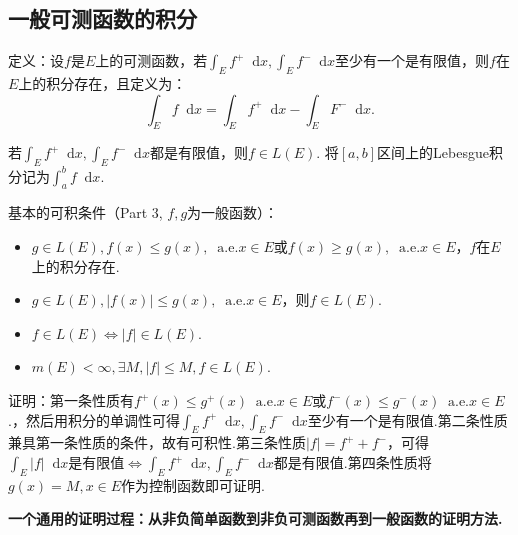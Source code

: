 \documentclass[bwprint, withoutpreface]{cumcmthesis}
\newcommand*{\dif}{\mathop{}\!\mathrm{d}}
\begin{document}
\subsection{一般可测函数的积分}
\indent 定义：设$f$是$E$上的可测函数，若$\int_E f^+ \dif x, \int_E f^- \dif x$至少有一个是有限值，则$f$在$E$上的积分存在，且定义为：
\begin{equation*}
	\int_E f \dif x = \int_E f^+ \dif x - \int_E F^- \dif x.
\end{equation*}

若$\int_E f^+ \dif x, \int_E f^- \dif x$都是有限值，则$f \in L(E)$. 将$[a, b]$区间上的Lebesgue积分记为$\int_{a}^{b}{f \dif x}$.

基本的可积条件（Part 3, $f, g$为一般函数）：
\begin{itemize}[itemindent=2em]
	\item $g \in L(E), f(x) \leqslant g(x), \mathop{} \! \mathrm{a.e.} x \in E \mbox{或} f(x) \geqslant g(x), \mathop{} \! \mathrm{a.e.} x \in E$，$f$在$E$上的积分存在.
	\item $g \in L(E), |f(x)| \leqslant g(x), \mathop{} \! \mathrm{a.e.} x \in E$，则$f \in L(E)$.
	\item $f \in L(E) \Leftrightarrow |f| \in L(E)$.
	\item $m(E) < \infty, \exists M, |f| \leqslant M, f \in L(E)$.
\end{itemize}

证明：第一条性质有$f^+(x) \leqslant g^+(x) \mathop{} \! \mathrm{a.e.} x \in E \mbox{或} f^-(x) \leqslant g^-(x) \mathop{} \! \mathrm{a.e.} x \in E$.，然后用积分的单调性可得$\int_E f^+ \dif x, \int_E f^- \dif x$至少有一个是有限值.第二条性质兼具第一条性质的条件，故有可积性.第三条性质$|f| = f^+ + f^-$，可得$\int_E |f| \dif x \mbox{是有限值} \Leftrightarrow \int_E f^+ \dif x, \int_E f^- \dif x \mbox{都是有限值}$.第四条性质将$g(x)=M, x \in E$作为控制函数即可证明.

\textbf{一个通用的证明过程：从非负简单函数到非负可测函数再到一般函数的证明方法.}
\end{document}

